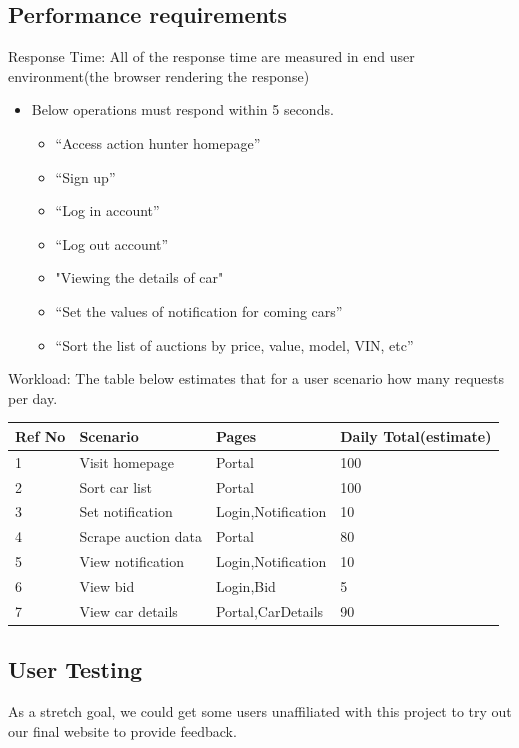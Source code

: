 \documentclass[onecolumn, draftclsnofoot,10pt, compsoc]{IEEEtran}
\begin{document}
\subsection{Performance requirements}
Response Time: All of the response time are measured in end user environment(the browser rendering the response)
\begin{itemize}
\item Below operations must respond within 5 seconds.
\begin{itemize}
    \item “Access action hunter homepage”
    \item “Sign up”
    \item “Log in account”
    \item “Log out account”
    \item "Viewing the details of car"
    \item “Set the values of notification for coming cars”  
    \item “Sort the list of auctions by price, value, model, VIN, etc”
\end{itemize}
\end{itemize}

\begin{center}
Workload: The table below estimates that for a user scenario how many requests per day.\\
\begin{tabular}{ | m{2cm} | m{4cm}| m{3cm} | m{3cm} | } 
\hline
Ref No & Scenario & Pages & Daily Total(estimate) \\ \hline
1 &Visit homepage   &Portal  &100\\  
\hline
2 &Sort car list  &Portal  &100\\
\hline
3 &Set notification  &Login,Notification  &10\\
\hline
\hline
4 &Scrape auction data  &Portal  &80\\
\hline
5 &View notification  &Login,Notification  &10\\
\hline
6 &View bid  &Login,Bid  &5\\
\hline
7 &View car details  &Portal,CarDetails &90\\
\hline
\end{tabular}
\end{center}


\subsection{User Testing}
As a stretch goal, we could get some users unaffiliated with this project to try out our final website to provide feedback. 
\end{document}
